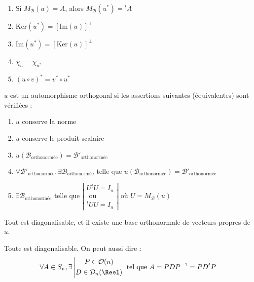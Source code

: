\documentclass[11pt,a4paper,fleqn,pdftex]{report}
\begin{document}
\begin{prop}
    \renewcommand{\theenumi}{\roman{enumi}}%
    \begin{enumerate}
        \item Si $M_\mathcal{B}(u) = A$, alors $M_\mathcal{B}(u^*) = {}^tA$
        \item $\mathrm{Ker}(u^*) = \left[ \mathrm{Im}(u) \right]^\perp$
        \item $\mathrm{Im}(u^*) = \left[ \mathrm{Ker}(u) \right]^\perp$
        \item $\chi_u = \chi_{u^*}$
        \item $(u\circ v)^* = v^* \circ u^*$
    \end{enumerate}
\end{prop}

\begin{theorem}
    $u$ est un automorphisme orthogonal si les assertions suivantes (équivalentes) sont vérifiées :
    \renewcommand{\theenumi}{\roman{enumi}}%
    \begin{enumerate}
        \item $u$ conserve la norme
        \item $u$ conserve le produit scalaire
        \item $u\left(\mathcal{B}_\text{orthonormée}\right) = \mathcal{B}'_\text{orthonormée}$
        \item $\forall \mathcal{B'}_\text{orthonormée}, \exists \mathcal{B}_\text{orthonormée}$ telle que $u\left(\mathcal{B}_\text{orthonormée}\right) = \mathcal{B}'_\text{orthonormée}$
        \item $\exists \mathcal{B}_\text{orthonormée} $ telle que $\left| \begin{gathered}
            U{}^tU = I_n\\
            \text{ ou }\\
            {}^tUU = I_n
        \end{gathered}\right|$ où $U = M_\mathcal{B}(u)$
    \end{enumerate}
\end{theorem}

\begin{itheorem}
    Tout  est diagonalisable, et il existe une base orthonormale de vecteurs propres de $u$.\par

    Toute  est diagonalisable. On peut aussi dire : 
    \begin{equation}
    \forall A \in S_n, \exists  \left| \begin{gathered} P \in \mathcal{O}(n) \\ D \in \mathcal{D}_n(\Reel) \end{gathered} \right. \text{ tel que } A = PDP^{-1} = PD{}^tP
    \end{equation}
\end{itheorem}
\end{document}
